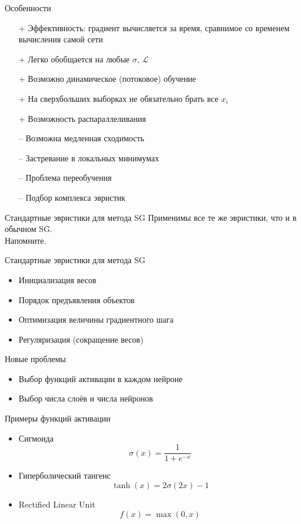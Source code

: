 \documentclass[10pt]{beamer}
\begin{document}
\begin{frame}{Особенности}
	\begin{enumerate}[<+->]
	\item[+] Эффективность: градиент вычисляется за время, сравнимое со временем вычисления самой сети
	\item[+] Легко обобщается на любые $\sigma$, $\mathcal{L}$
	\item[+] Возможно динамическое (потоковое) обучение
	\item[+] На сверхбольших выборках не обязательно брать все $x_i$
	\item[+] Возможность распараллеливания
	\bigbreak
	\item[--] Возможна медленная сходимость
	\item[--] Застревание в локальных минимумах
	\item[--] Проблема переобучения
	\item[--] Подбор комплекса эвристик
	\end{enumerate}
\end{frame}


\begin{frame}{Стандартные эвристики для метода SG}
	Применимы все те же эвристики, что и в обычном SG.\\
	\bigbreak
	\pause
	Напомните.
\end{frame}

\begin{frame}{Стандартные эвристики для метода SG}
	\begin{itemize}[<+->]
		\item Инициализация весов
		\item Порядок предъявления объектов
		\item Оптимизация величины градиентного шага
		\item Регуляризация (сокращение весов)
	\end{itemize}
\end{frame}

\begin{frame}{Новые проблемы}
	\begin{itemize}[<+->]
		\item Выбор функций активации в каждом нейроне
		\item Выбор числа слоёв и числа нейронов
	\end{itemize}
\end{frame}

\begin{frame}{Примеры функций активации}
	\begin{itemize}[<+->]
		\item Сигмоида
		$$\sigma(x) = \frac{1}{1 + e^{-x}}$$
		\item Гиперболический тангенс
		$$\tanh(x) = 2\sigma(2x) - 1$$
		\item Rectified Linear Unit
		$$f(x) = \max(0, x)$$
	\end{itemize}
\end{frame}
\end{document}
